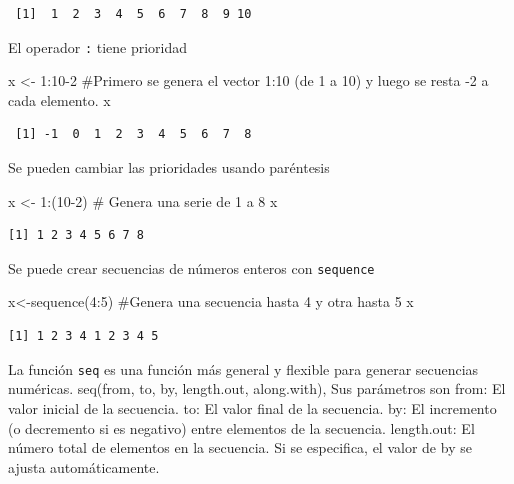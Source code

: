 \documentclass[
  letterpaper,
]{scrbook}
\newenvironment{Shaded}{\begin{snugshade}}{\end{snugshade}}
\newcommand{\CommentTok}[1]{\textcolor[rgb]{0.37,0.37,0.37}{#1}}
\newcommand{\DecValTok}[1]{\textcolor[rgb]{0.68,0.00,0.00}{#1}}
\newcommand{\FunctionTok}[1]{\textcolor[rgb]{0.28,0.35,0.67}{#1}}
\newcommand{\NormalTok}[1]{\textcolor[rgb]{0.00,0.23,0.31}{#1}}
\newcommand{\OtherTok}[1]{\textcolor[rgb]{0.00,0.23,0.31}{#1}}
\newcommand{\SpecialCharTok}[1]{\textcolor[rgb]{0.37,0.37,0.37}{#1}}
\begin{document}
\begin{verbatim}
 [1]  1  2  3  4  5  6  7  8  9 10
\end{verbatim}

El operador \texttt{:} tiene prioridad

\begin{Shaded}
\begin{Highlighting}[]
\NormalTok{x }\OtherTok{\textless{}{-}} \DecValTok{1}\SpecialCharTok{:}\DecValTok{10{-}2} \CommentTok{\#Primero se genera el vector 1:10 (de 1 a 10) y luego se resta {-}2 a cada elemento.}
\NormalTok{x}
\end{Highlighting}
\end{Shaded}

\begin{verbatim}
 [1] -1  0  1  2  3  4  5  6  7  8
\end{verbatim}

Se pueden cambiar las prioridades usando paréntesis

\begin{Shaded}
\begin{Highlighting}[]
\NormalTok{x }\OtherTok{\textless{}{-}} \DecValTok{1}\SpecialCharTok{:}\NormalTok{(}\DecValTok{10{-}2}\NormalTok{) }\CommentTok{\# Genera una serie de 1 a 8}
\NormalTok{x}
\end{Highlighting}
\end{Shaded}

\begin{verbatim}
[1] 1 2 3 4 5 6 7 8
\end{verbatim}

Se puede crear secuencias de números enteros con \texttt{sequence}

\begin{Shaded}
\begin{Highlighting}[]
\NormalTok{x}\OtherTok{\textless{}{-}}\FunctionTok{sequence}\NormalTok{(}\DecValTok{4}\SpecialCharTok{:}\DecValTok{5}\NormalTok{) }
\CommentTok{\#Genera una secuencia hasta 4 y otra hasta 5}
\NormalTok{x}
\end{Highlighting}
\end{Shaded}

\begin{verbatim}
[1] 1 2 3 4 1 2 3 4 5
\end{verbatim}

La función \texttt{seq} es una función más general y flexible para
generar secuencias numéricas. seq(from, to, by, length.out, along.with),
Sus parámetros son from: El valor inicial de la secuencia. to: El valor
final de la secuencia. by: El incremento (o decremento si es negativo)
entre elementos de la secuencia. length.out: El número total de
elementos en la secuencia. Si se especifica, el valor de by se ajusta
automáticamente.
\end{document}
